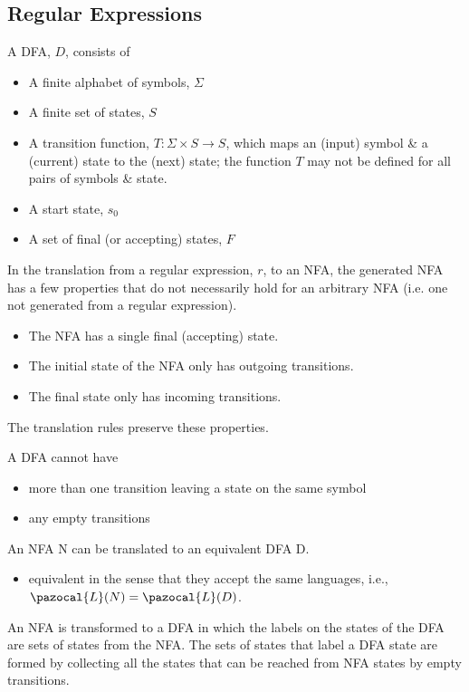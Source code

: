 \subsection{Regular Expressions}
A DFA, $D$, consists of
\begin{itemize}
    \item A finite alphabet of symbols, $\Sigma$
    \item A finite set of states, $S$
    \item A transition function, $T : \Sigma \times S \rightarrow S$, which maps an (input) symbol \& a (current) state to the (next) state; the function $T$ may not be defined for all pairs of symbols \& state. 
    \item A start state, $s_0$ 
    \item A set of final (or accepting) states, $F$
\end{itemize}



In the translation from a regular expression, $r$, to an NFA, the generated NFA has a few properties that do not necessarily hold for an arbitrary NFA (i.e. one not generated from a regular expression).
\begin{itemize}
    \item The NFA has a single final (accepting) state.
    \item The initial state of the NFA only has outgoing transitions.
    \item The final state only has incoming transitions.
\end{itemize}
The translation rules preserve these properties.

A DFA cannot have 
\begin{itemize}
    \item more than one transition leaving a state on the same symbol
    \item any empty transitions
\end{itemize}
An NFA N can be translated to an equivalent DFA D.
\begin{itemize}
    \item equivalent in the sense that they accept the same languages, i.e., $\pazocal{L}(N) = \pazocal{L}(D)$.
\end{itemize}

An NFA is transformed to a DFA in which the labels on the states of the DFA are sets of states from the NFA.
The sets of states that label a DFA state are formed by collecting all the states that can be reached from NFA states by empty transitions. 

